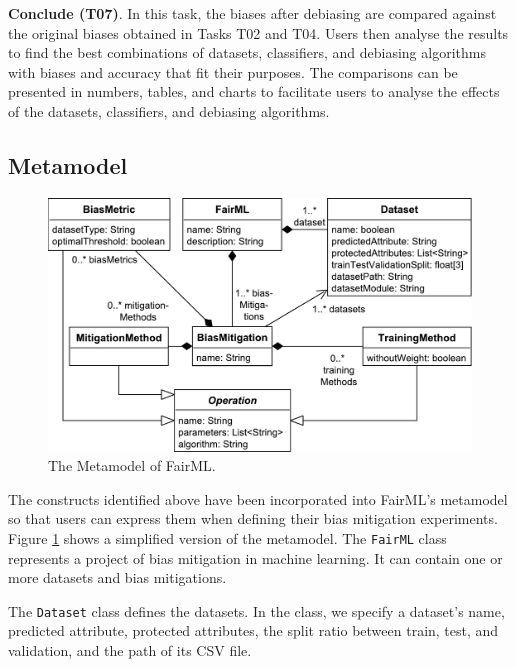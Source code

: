 \documentclass[sigconf]{acmart}
\begin{document}
{		\textbf{Conclude (T07)}. In this task, the biases after debiasing are compared against the original biases obtained in Tasks T02 and T04. Users then analyse the results to find the best combinations of datasets, classifiers, and debiasing algorithms with biases and accuracy that fit their purposes. The comparisons can be presented in numbers, tables, and charts to facilitate users to analyse the effects of the datasets, classifiers, and debiasing algorithms. 
		
		\subsection{Metamodel}
		\label{sec:metamodel}
		
		\begin{figure}
			\includegraphics[width=\linewidth]{figures/metamodel}
			\caption{The Metamodel of FairML.}
			\label{fig:metamodel}
		\end{figure}
		
		The constructs identified above have been incorporated into FairML's metamodel so that users can express them when defining their bias mitigation experiments. Figure \ref{fig:metamodel} shows a simplified version of the metamodel. The \texttt{FairML} class represents a project of bias mitigation in machine learning. It can contain one or more datasets and bias mitigations. 
		
		The \texttt{Dataset} class defines the datasets. In the class, we specify a dataset's name, predicted attribute, protected attributes, the split ratio between train, test, and validation, and the path of its CSV file.
		
}
\end{document}
